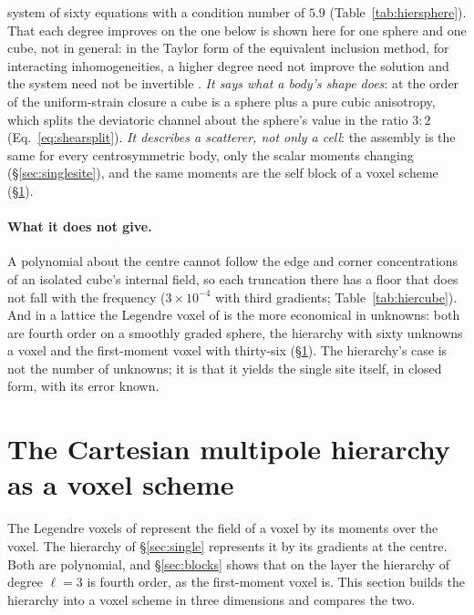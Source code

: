 \documentclass[11pt,a4paper]{article}
\begin{document}
system of sixty equations with a condition number of $5.9$ (Table~\ref{tab:hiersphere}). That each degree
improves on the one below is shown here for one sphere and one cube, not in general: in the Taylor form
of the equivalent inclusion method, for interacting inhomogeneities, a higher degree need not improve
the solution and the system need not be invertible \citep{RodinHwang1991,Brisard2014}. \emph{It says
what a body's shape does}: at the order of the uniform-strain closure a cube is a sphere plus a pure
cubic anisotropy, which splits the deviatoric channel about the sphere's value in the ratio $3:2$
(Eq.~\eqref{eq:shearsplit}). \emph{It describes a scatterer, not only a cell}: the assembly is the same
for every centrosymmetric body, only the scalar moments changing (\S\ref{sec:singlesite}), and the same
moments are the self block of a voxel scheme (\S\ref{sec:gradvoxel}).

\paragraph{What it does not give.} A polynomial about the centre cannot follow the edge and corner
concentrations of an isolated cube's internal field, so each truncation there has a floor that does
not fall with the frequency ($3\times10^{-4}$ with third gradients; Table~\ref{tab:hiercube}). And in a
lattice the Legendre voxel of \citet{NestorError2026} is the more economical in unknowns: both are fourth
order on a smoothly graded sphere, the hierarchy with sixty unknowns a voxel and the first-moment voxel
with thirty-six (\S\ref{sec:gradvoxel}). The hierarchy's case is not the number of unknowns; it is that
it yields the single site itself, in closed form, with its error known.


\section{The Cartesian multipole hierarchy as a voxel scheme}\label{sec:gradvoxel}

The Legendre voxels of \citet{NestorError2026} represent the field of a voxel by its moments over the
voxel. The hierarchy of \S\ref{sec:single} represents it by its gradients at the centre. Both are
polynomial, and \S\ref{sec:blocks} shows that on the layer the hierarchy of degree $\ell=3$ is fourth
order, as the first-moment voxel is. This section builds the hierarchy into a voxel scheme in three
dimensions and compares the two.
\end{document}
